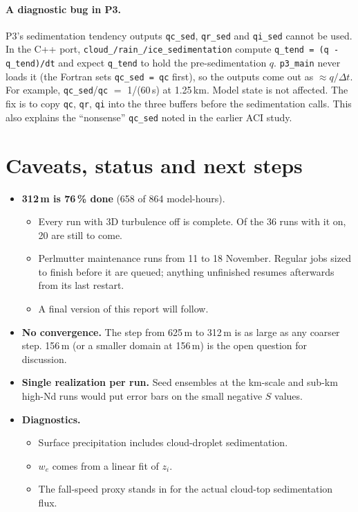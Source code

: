 \documentclass[10pt]{article}
\begin{document}
\paragraph{A diagnostic bug in P3.} P3's sedimentation tendency outputs \texttt{qc\_sed}, \texttt{qr\_sed} and \texttt{qi\_sed} cannot be used. In the C++ port,
\texttt{cloud\_/rain\_/ice\_sedimentation} compute \texttt{q\_tend = (q - q\_tend)/dt} and expect \texttt{q\_tend} to hold the pre-sedimentation $q$.
\texttt{p3\_main} never loads it (the Fortran sets \texttt{qc\_sed = qc} first), so the outputs come out as $\approx q/\Delta t$.
For example, \texttt{qc\_sed}/\texttt{qc} $=$ 1/(60\,s) at 1.25\,km. Model state is not affected. The fix is to copy \texttt{qc}, \texttt{qr}, \texttt{qi} into the three buffers before the sedimentation calls.
This also explains the ``nonsense'' \texttt{qc\_sed} noted in the earlier ACI study.

\section{Caveats, status and next steps}
\begin{itemize}
\item \textbf{312\,m is 76\,\% done} (658 of 864 model-hours).
\begin{itemize}
\item Every run with 3D turbulence off is complete. Of the 36 runs with it on, 20 are still to come.
\item Perlmutter maintenance runs from 11 to 18 November. Regular jobs sized to finish before it are queued; anything unfinished resumes afterwards from its last restart.
\item A final version of this report will follow.
\end{itemize}
\item \textbf{No convergence.} The step from 625\,m to 312\,m is as large as any coarser step. 156\,m (or a smaller domain at 156\,m) is the open question for discussion.
\item \textbf{Single realization per run.} Seed ensembles at the km-scale and sub-km high-Nd runs would put error bars on the small negative $S$ values.
\item \textbf{Diagnostics.}
\begin{itemize}
\item Surface precipitation includes cloud-droplet sedimentation.
\item $w_e$ comes from a linear fit of $z_i$.
\item The fall-speed proxy stands in for the actual cloud-top sedimentation flux.
\end{itemize}
\end{itemize}
\end{document}
